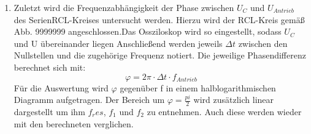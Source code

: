 \begin{enumerate}
         \item Zuletzt wird die Frequenzabhängigkeit der Phase zwischen $U_C$ und $U_{Antrieb}$ des
          SerienRCL-Kreises untersucht werden. Hierzu wird der RCL-Kreis gemäß Abb. 9999999
          angeschlossen.Das Ossziloskop wird so eingestellt, sodass $U_C$ und U übereinander liegen
             Anschließend werden jeweils
      $\Delta t$ zwischen den Nullstellen und die zugehörige Frequenz notiert. Die jeweilige
       Phasendifferenz berechnet sich mit:
       \begin{equation}
         \varphi = 2 \pi \cdot \Delta t \cdot f_{Antrieb}
       \end{equation}
       Für die Auswertung wird $\varphi$ gegenüber f in einem halblogarithmischen
        Diagramm aufgetragen. Der Bereich um $\varphi = \frac{pi}{2}$ wird zusätzlich
         linear dargestellt um ihm $f_res$, $f_1$ und $f_2$ zu entnehmen. Auch diese werden wieder
         mit den berechneten verglichen.
\end{enumerate}
